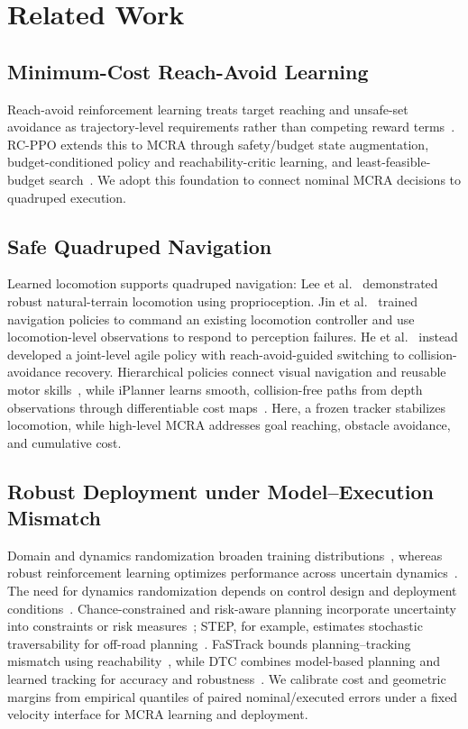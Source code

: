 \documentclass[conference]{IEEEtran}
\begin{document}
\section{Related Work}
\subsection{Minimum-Cost Reach-Avoid Learning}
Reach-avoid reinforcement learning treats target reaching and unsafe-set
avoidance as trajectory-level requirements rather than competing reward
terms~\cite{bansal2017,hsu2021}. RC-PPO extends this to MCRA through safety/budget
state augmentation, budget-conditioned policy and reachability-critic learning,
and least-feasible-budget search~\cite{so2024}. We adopt this foundation to
connect nominal MCRA decisions to quadruped execution.

\subsection{Safe Quadruped Navigation}
Learned locomotion supports quadruped navigation: Lee et al.~\cite{lee2020}
demonstrated robust natural-terrain locomotion using proprioception. Jin et
al.~\cite{jin2023resilient} trained navigation policies to command an existing
locomotion controller and use locomotion-level observations to respond to
perception failures. He et al.~\cite{he2024abs} instead developed a joint-level
agile policy with reach-avoid-guided switching to collision-avoidance recovery.
Hierarchical policies connect visual navigation and reusable motor
skills~\cite{jain2021pixels}, while iPlanner learns smooth, collision-free paths
from depth observations through differentiable cost maps~\cite{yang2023iplanner}.
Here, a frozen tracker stabilizes locomotion, while high-level MCRA addresses
goal reaching, obstacle avoidance, and cumulative cost.

\subsection{Robust Deployment under Model--Execution Mismatch}
Domain and dynamics randomization broaden training
distributions~\cite{tobin2017,tan2018simreal}, whereas robust reinforcement
learning optimizes performance across uncertain dynamics~\cite{wang2021}.
The need for dynamics randomization depends on control design and deployment
conditions~\cite{xie2021randomization}. Chance-constrained and risk-aware planning
incorporate uncertainty into constraints or risk
measures~\cite{theurkauf2023,fan2021step}; STEP, for example, estimates stochastic
traversability for off-road planning~\cite{fan2021step}. FaSTrack bounds
planning--tracking mismatch using reachability~\cite{herbert2017fastrack}, while
DTC combines model-based planning and learned tracking for accuracy and
robustness~\cite{jenelten2024dtc}. We calibrate cost and geometric margins
from empirical quantiles of paired nominal/executed errors under a fixed velocity
interface for MCRA learning and deployment.
\end{document}
